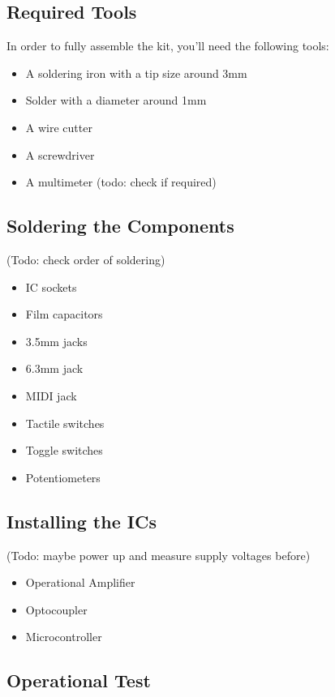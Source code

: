 \documentclass{scrartcl}
\begin{document}
\subsection{Required Tools}

In order to fully assemble the kit, you'll need the following tools:

\begin{itemize}
    \item A soldering iron with a tip size around 3mm
    \item Solder with a diameter around 1mm
    \item A wire cutter
    \item A screwdriver
    \item A multimeter (todo: check if required)
\end{itemize}

\subsection{Soldering the Components}

(Todo: check order of soldering)

\begin{itemize}
    \item IC sockets
    \item Film capacitors
    \item 3.5mm jacks
    \item 6.3mm jack
    \item MIDI jack
    \item Tactile switches
    \item Toggle switches
    \item Potentiometers
\end{itemize}

\subsection{Installing the ICs}

(Todo: maybe power up and measure supply voltages before)

\begin{itemize}
    \item Operational Amplifier
    \item Optocoupler
    \item Microcontroller
\end{itemize}

\subsection{Operational Test}
\end{document}
